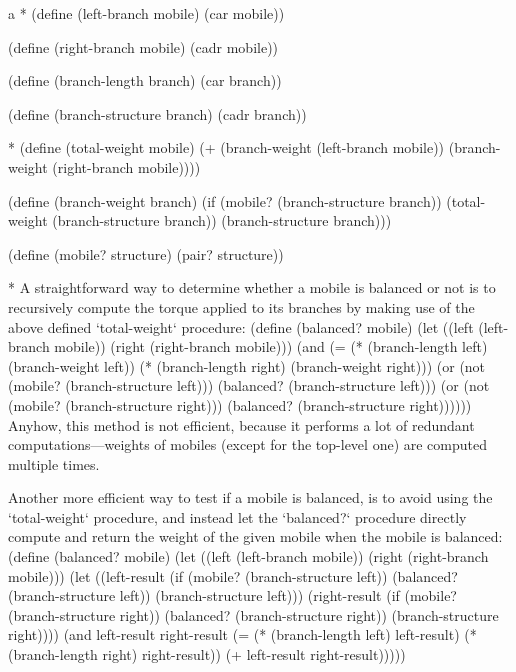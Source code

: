 \begitems\style a
* \removettskip\begtt\scm
(define (left-branch mobile)
  (car mobile))

(define (right-branch mobile)
  (cadr mobile))

(define (branch-length branch)
  (car branch))

(define (branch-structure branch)
  (cadr branch))
\endtt

* \removettskip\begtt\scm
(define (total-weight mobile)
  (+ (branch-weight (left-branch mobile))
     (branch-weight (right-branch mobile))))

(define (branch-weight branch)
  (if (mobile? (branch-structure branch))
      (total-weight (branch-structure branch))
      (branch-structure branch)))

(define (mobile? structure)
  (pair? structure))
\endtt

* A straightforward way to determine whether a mobile is balanced or not is to recursively compute the torque applied to its branches by making use of the above defined `total-weight` procedure: 
\begtt\scm
(define (balanced? mobile)
  (let ((left (left-branch mobile))
        (right (right-branch mobile)))
    (and (= (* (branch-length left) (branch-weight left))
            (* (branch-length right) (branch-weight right)))
          (or (not (mobile? (branch-structure left)))
              (balanced? (branch-structure left)))
          (or (not (mobile? (branch-structure right)))
              (balanced? (branch-structure right))))))
\endtt
Anyhow, this method is not efficient, because it performs a lot of redundant computations---weights of mobiles (except for the top-level one) are computed multiple times.

Another more efficient way to test if a mobile is balanced, is to avoid using the `total-weight` procedure, and instead let the `balanced?` procedure directly compute and return the weight of the given mobile when the mobile is balanced:
\begtt\scm
(define (balanced? mobile)
  (let ((left (left-branch mobile))
        (right (right-branch mobile)))
    (let ((left-result (if (mobile? (branch-structure left))
                           (balanced? (branch-structure left))
                           (branch-structure left)))
          (right-result (if (mobile? (branch-structure right))
                            (balanced? (branch-structure right))
                            (branch-structure right))))
      (and left-result
           right-result
           (= (* (branch-length left) left-result)
              (* (branch-length right) right-result))
           (+ left-result right-result)))))
\endtt

